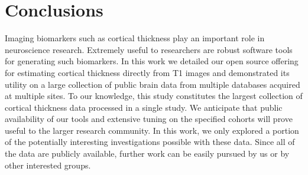 \section{Conclusions}

Imaging biomarkers such as cortical thickness play an 
important role in neuroscience research.  Extremely useful to
researchers are robust software tools for generating such 
biomarkers.  In this work we detailed our open source offering for estimating
cortical thickness directly from T1 images and demonstrated
its utility on a large collection of public brain data from
multiple databases acquired at multiple sites.  To our knowledge,
this study constitutes the largest collection of cortical
thickness data processed in a single study.  
We anticipate that public availability of our tools and extensive tuning on
the specified cohorts will prove useful to the larger
research community.   In this work, we only explored a portion of the potentially
interesting investigations possible with these data.
Since all of the data are publicly available, further work can
be easily pursued by us or by other interested groups.